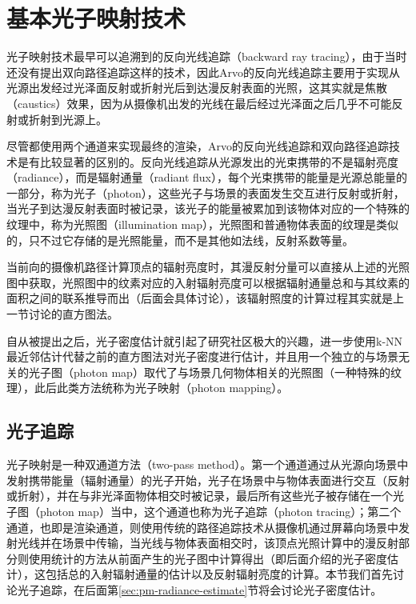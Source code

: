 \section{基本光子映射技术}\label{sec:pm-regular-pm}
光子映射技术最早可以追溯到\cite{a:Backwardraytracing}的反向光线追踪（backward ray tracing），由于当时还没有提出双向路径追踪这样的技术，因此Arvo的反向光线追踪主要用于实现从光源出发经过光泽面反射或折射光后到达漫反射表面的光照，这其实就是焦散（caustics）效果，因为从摄像机出发的光线在最后经过光泽面之后几乎不可能反射或折射到光源上。

尽管都使用两个通道来实现最终的渲染，Arvo的反向光线追踪和双向路径追踪技术是有比较显著的区别的。反向光线追踪从光源发出的光束携带的不是辐射亮度（radiance），而是辐射通量（radiant flux），每个光束携带的能量是光源总能量的一部分，称为光子（photon），这些光子与场景的表面发生交互进行反射或折射，当光子到达漫反射表面时被记录，该光子的能量被累加到该物体对应的一个特殊的纹理中，称为光照图（illumination map），光照图和普通物体表面的纹理是类似的，只不过它存储的是光照能量，而不是其他如法线，反射系数等量。

当前向的摄像机路径计算顶点的辐射亮度时，其漫反射分量可以直接从上述的光照图中获取，光照图中的纹素对应的入射辐射亮度可以根据辐射通量总和与其纹素的面积之间的联系推导而出（后面会具体讨论），该辐射照度的计算过程其实就是上一节讨论的直方图法。

自从被提出之后，光子密度估计就引起了研究社区极大的兴趣，\cite{a:GlobalIlluminationusingPhotonMaps}进一步使用k-NN最近邻估计代替之前的直方图法对光子密度进行估计，并且用一个独立的与场景无关的光子图（photon map）取代了与场景几何物体相关的光照图（一种特殊的纹理），此后此类方法统称为光子映射（photon mapping）。




\subsection{光子追踪}\label{sec:pm-photon-tracing}
光子映射是一种双通道方法（two-pass method）。第一个通道通过从光源向场景中发射携带能量（辐射通量）的光子开始，光子在场景中与物体表面进行交互（反射或折射），并在与非光泽面物体相交时被记录，最后所有这些光子被存储在一个光子图（photon map）当中，这个通道也称为光子追踪（photon tracing）；第二个通道，也即是渲染通道，则使用传统的路径追踪技术从摄像机通过屏幕向场景中发射光线并在场景中传输，当光线与物体表面相交时，该顶点光照计算中的漫反射部分则使用统计的方法从前面产生的光子图中计算得出（即后面介绍的光子密度估计），这包括总的入射辐射通量的估计以及反射辐射亮度的计算。本节我们首先讨论光子追踪，在后面第\ref{sec:pm-radiance-estimate}节将会讨论光子密度估计。

